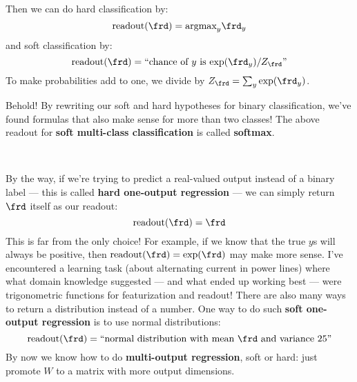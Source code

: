   Then we can do hard classification by:
  $$
    \text{readout}(\frd) = \text{argmax}_{y} \frd_y
  $$
  and soft classification by:
  $$
    \text{readout}(\frd) = \text{``chance of $y$ is $\exp(\frd_y)/Z_\frd$''}
  $$
  To make probabilities add to one, we divide by $Z_\frd = \sum_y
  \exp(\frd_y)$.

  Behold!  By rewriting our soft and hard hypotheses for binary classification,
  we've found formulas that also make sense for more than two classes!  The
  above readout for \textbf{soft multi-class classification} is called
  \textbf{softmax}.
  \begin{marginfigure}
    \\
  \end{marginfigure}




  By the way, if we're trying to predict a real-valued output instead of a
  binary label --- this is called \textbf{hard one-output regression} --- we can
  simply return $\frd$ itself as our readout:
  $$
    \text{readout}(\frd) = \frd
  $$
  This is far from the only choice!
  For example, if we know that the true
  $y$s will always be positive, then $\text{readout}(\frd) = \exp(\frd)$ may
  make more sense.
    I've encountered a learning task (about alternating current in power lines)
    where what domain knowledge suggested --- and what ended up working best ---
    were trigonometric functions for featurization and readout!
  There are also many ways to return a distribution instead of a number.  One
  way to do such \textbf{soft one-output regression} is to use normal distributions:
  $$
    \text{readout}(\frd) = \text{``normal distribution with mean $\frd$ and variance $25$''}
  $$
  By now we know how to do \textbf{multi-output regression}, soft or hard: just
  promote $W$ to a matrix with more output dimensions.

